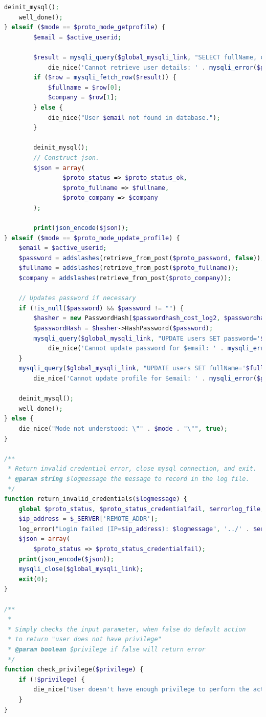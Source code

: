 \documentclass[a4paper,twoside]{article}
\begin{document}
\begin{enumerate}
\begin{lstlisting}[language=PHP,basicstyle=\tiny,caption=handle.php,label={lst:handle.php}]
	deinit_mysql();
	well_done();
} elseif ($mode == $proto_mode_getprofile) {
		$email = $active_userid;
	
		$result = mysqli_query($global_mysqli_link, "SELECT fullName, company FROM users WHERE email='$email'") or
			die_nice('Cannot retrieve user details: ' . mysqli_error($global_mysqli_link));
		if ($row = mysqli_fetch_row($result)) {
			$fullname = $row[0];
			$company = $row[1];
		} else {
			die_nice("User $email not found in database.");
		} 
	
		deinit_mysql();
		// Construct json.
		$json = array(
				$proto_status => $proto_status_ok,
				$proto_fullname => $fullname,
				$proto_company => $company
		);
		
		print(json_encode($json));
} elseif ($mode == $proto_mode_update_profile) {
	$email = $active_userid;
	$password = addslashes(retrieve_from_post($proto_password, false));
	$fullname = addslashes(retrieve_from_post($proto_fullname));
	$company = addslashes(retrieve_from_post($proto_company));

	// Updates password if necessary
	if (!is_null($password) && $password != "") {		
		$hasher = new PasswordHash($passwordhash_cost_log2, $passwordhash_portable);
		$passwordHash = $hasher->HashPassword($password);
		mysqli_query($global_mysqli_link, "UPDATE users SET password='$passwordHash' WHERE email='$email'") or
			die_nice('Cannot update password for $email: ' . mysqli_error($global_mysqli_link));
	}
	mysqli_query($global_mysqli_link, "UPDATE users SET fullName='$fullname', company='$company' WHERE email='$email'") or
		die_nice('Cannot update profile for $email: ' . mysqli_error($global_mysqli_link));

	deinit_mysql();
	well_done();
} else {
	die_nice("Mode not understood: \"" . $mode . "\"", true);
}

/**
 * Return invalid credential error, close mysql connection, and exit.
 * @param string $logmessage the message to record in the log file.
 */
function return_invalid_credentials($logmessage) {
	global $proto_status, $proto_status_credentialfail, $errorlog_file, $global_mysqli_link;
	$ip_address = $_SERVER['REMOTE_ADDR'];
	log_error("Login failed (IP=$ip_address): $logmessage", '../' . $errorlog_file);
	$json = array(
		$proto_status => $proto_status_credentialfail);
	print(json_encode($json));
	mysqli_close($global_mysqli_link);
	exit(0);
}

/**
 * 
 * Simply checks the input parameter, when false do default action
 * to return "user does not have privilege"
 * @param boolean $privilege if false will return error
 */
function check_privilege($privilege) {
	if (!$privilege) {
		die_nice("User doesn't have enough privilege to perform the action.", true);
	}
}


\end{lstlisting}
\end{enumerate}
\end{document}
